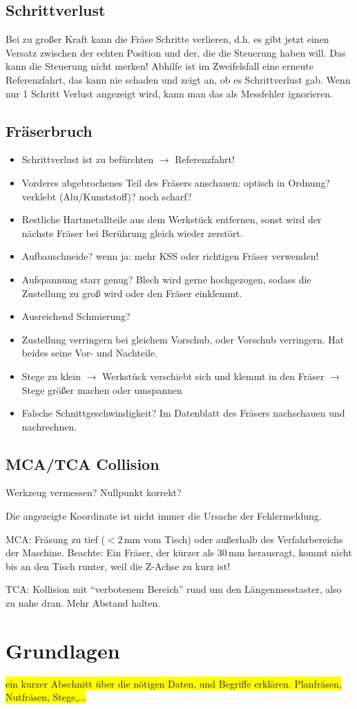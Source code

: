 \documentclass{\basedir/fablab-document}
\renewcommand{\todo}[1]{\colorbox{yellow}{{#1}}}
\begin{document}
\subsection{Schrittverlust}
Bei zu großer Kraft kann die Fräse Schritte verlieren, d.h. es gibt jetzt einen Versatz zwischen der echten Position und der, die die Steuerung haben will. Das kann die Steuerung nicht merken! Abhilfe ist im Zweifelsfall eine erneute Referenzfahrt, das kann nie schaden und zeigt an, ob es Schrittverlust gab. Wenn nur 1 Schritt Verlust angezeigt wird, kann man das als Messfehler ignorieren.

\subsection{Fräserbruch}
\begin{itemize}
 \item Schrittverlust ist zu befürchten $\rightarrow$ Referenzfahrt!
 \item Vorderes abgebrochenes Teil des Fräsers anschauen: optisch in Ordnung? verklebt (Alu/Kunststoff)? noch scharf?
 \item Restliche Hartmetallteile aus dem Werkstück entfernen, sonst wird der nächste Fräser bei Berührung gleich wieder zerstört.
 \item Aufbauschneide? wenn ja: mehr KSS oder richtigen Fräser verwenden!
 \item Aufspannung starr genug? Blech wird gerne hochgezogen, sodass die Zustellung zu groß wird oder den Fräser einklemmt.
 \item Ausreichend Schmierung?
 \item Zustellung verringern bei gleichem Vorschub, oder Vorschub verringern. Hat beides seine Vor- und Nachteile.
 \item Stege zu klein $\rightarrow$ Werkstück verschiebt sich und klemmt in den Fräser $\rightarrow$ Stege größer machen oder umspannen
 \item Falsche Schnittgeschwindigkeit? Im Datenblatt des Fräsers nachschauen und nachrechnen.
 \end{itemize}


\subsection{MCA/TCA Collision}
Werkzeug vermessen? Nullpunkt korrekt?

Die angezeigte Koordinate ist nicht immer die Ursache der Fehlermeldung.

MCA: Fräsung zu tief ($<2$\,mm vom Tisch) oder außerhalb des Verfahrbereichs der Maschine. Beachte: Ein Fräser, der kürzer als 30\,mm herausragt, kommt nicht bis an den Tisch runter, weil die Z-Achse zu kurz ist!

TCA: Kollision mit \enquote{verbotenem Bereich} rund um den Längenmesstaster, also zu nahe dran. Mehr Abstand halten.

\section{Grundlagen}
\todo{ein kurzer Abschnitt über die nötigen Daten, und Begriffe erklären. Planfräsen, Nutfräsen, Stege,...}


\end{document}
